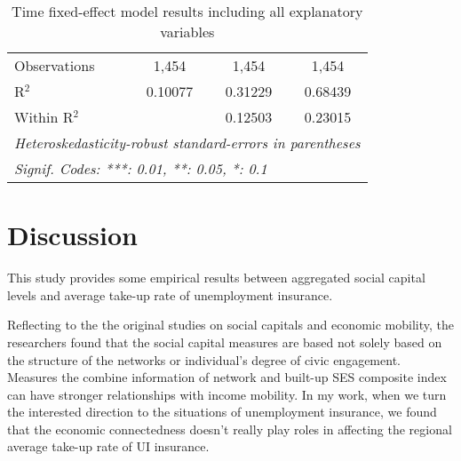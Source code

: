 \documentclass{article}
\begin{document}
\begin{table}[h!]
\begin{tabular}{lccc}
      Observations                 & 1,454          & 1,454          & 1,454\\  
      R$^2$                        & 0.10077        & 0.31229        & 0.68439\\  
      Within R$^2$                 &                & 0.12503        & 0.23015\\  
      \midrule \midrule
      \multicolumn{4}{l}{\emph{Heteroskedasticity-robust standard-errors in parentheses}}\\
      \multicolumn{4}{l}{\emph{Signif. Codes: ***: 0.01, **: 0.05, *: 0.1}}\\
   \end{tabular}
   \caption{Time fixed-effect model results including all explanatory variables}
   \label{result4}
\end{table}

\newpage
\section{Discussion}
This study provides some empirical results between aggregated social capital levels and average take-up rate of unemployment insurance. 

Reflecting to the the original studies on social capitals and economic mobility, the researchers found that the social capital measures are based not solely based on the structure of the networks or individual's degree of civic engagement. Measures the combine information of network and built-up SES composite index can have stronger relationships with income mobility. In my work, when we turn the interested direction to the situations of unemployment insurance, we found that the economic connectedness doesn't really play roles in affecting the regional average take-up rate of UI insurance. 
\end{document}
